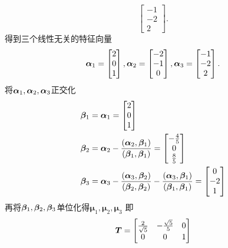 \documentclass[lang=cn,11pt,normal]{elegantbook}
\begin{document}
\begin{solution}
\begin{equation}
\begin{bmatrix}
		-1\\
		-2\\
		2
		\end{bmatrix}.
		\end{equation}
		得到三个线性无关的特征向量
		\begin{equation}
		\boldsymbol{\alpha}_1=
		\begin{bmatrix}
		2\\
		0\\
		1
		\end{bmatrix},
		\boldsymbol{\alpha}_2=
		\begin{bmatrix}
		-2\\
		-1\\
		0
		\end{bmatrix},
		\boldsymbol{\alpha}_3=
		\begin{bmatrix}
		-1\\
		-2\\
		2
		\end{bmatrix}.
		\end{equation}
		将$\boldsymbol{\alpha}_1,\boldsymbol{\alpha}_2,\boldsymbol{\alpha}_3$正交化\\
		\begin{equation}
		\begin{aligned}
		\boldsymbol{\beta}_1&=\boldsymbol{\alpha}_1=
		\begin{bmatrix}
		2\\0\\1
		\end{bmatrix}\\
		\boldsymbol{\beta}_2&=\boldsymbol{\alpha}_2-\frac{(\boldsymbol{\alpha}_2,\boldsymbol{\beta}_1)}{(\boldsymbol{\beta}_1,\boldsymbol{\beta}_1)}=
		\begin{bmatrix}
		-\frac{4}{5}\\0\\\frac{8}{5}
		\end{bmatrix}\\
		\boldsymbol{\beta}_3&=\boldsymbol{\alpha}_3-\frac{(\boldsymbol{\alpha}_3,\boldsymbol{\beta}_2)}{(\boldsymbol{\beta}_2,\boldsymbol{\beta}_2)}-\frac{(\boldsymbol{\alpha}_3,\boldsymbol{\beta}_1)}{(\boldsymbol{\beta}_1,\boldsymbol{\beta}_1)}=
		\begin{bmatrix}
		0\\-2\\1
		\end{bmatrix}
		\end{aligned}
		\end{equation}
		再将$\boldsymbol{\beta}_1,\boldsymbol{\beta}_2,\boldsymbol{\beta}_3$单位化得$\boldsymbol{\mu}_1,\boldsymbol{\mu}_2,\boldsymbol{\mu}_3$
		即
		\begin{equation}
		\boldsymbol{T}=
		\begin{bmatrix}
		\frac{2}{\sqrt{5}}&-\frac{\sqrt{5}}{5}&0\\
		0&0&1\\

\end{bmatrix}
\end{equation}
\end{solution}
\end{document}
